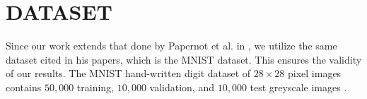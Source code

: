\section{DATASET}
Since our work extends that done by Papernot et al. in , we utilize the same dataset cited in his papers, which is the MNIST dataset. This ensures the validity of our results. The MNIST hand-written digit dataset of $28 \times 28$ pixel images contains $50,000$ training, $10,000$ validation, and $10,000$ test greyscale images \cite{mnist}. 


